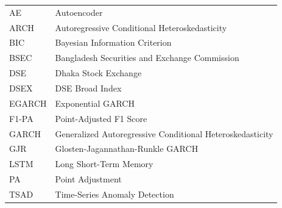 \noindent
\begin{tabular}{p{3.0cm}p{10.0cm}} 

AE 		& Autoencoder \\
ARCH	& Autoregressive Conditional Heteroskedasticity \\
BIC		& Bayesian Information Criterion \\
BSEC	& Bangladesh Securities and Exchange Commission \\
DSE 	& Dhaka Stock Exchange \\
DSEX	& DSE Broad Index \\
EGARCH	& Exponential GARCH \\
F1-PA	& Point-Adjusted F1 Score \\
GARCH	& Generalized Autoregressive Conditional Heteroskedasticity \\
GJR		& Glosten-Jagannathan-Runkle GARCH \\
LSTM	& Long Short-Term Memory \\
PA		& Point Adjustment \\
TSAD	& Time-Series Anomaly Detection \\

\end{tabular}
